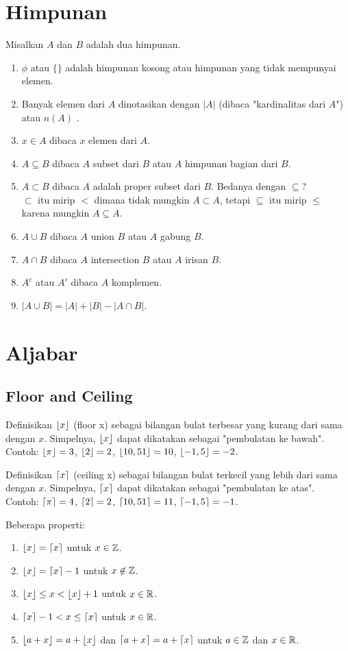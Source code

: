 \documentclass[11pt]{scrartcl}
\begin{document}
    	\section{Himpunan}    	
    	Misalkan $A$ dan $B$ adalah dua himpunan.
    	\begin{enumerate}
    	    \item $\phi$ atau $\{\}$ adalah himpunan kosong atau himpunan yang tidak mempunyai elemen.
    	    \item Banyak elemen dari $A$ dinotasikan dengan $|A|$ (dibaca "kardinalitas dari $A$") atau $n(A)$ .
    	    \item $x \in A$ dibaca $x$ elemen dari $A$.
    	    \item $A \subseteq B$ dibaca $A$ subset dari $B$ atau $A$ himpunan bagian dari $B$.
    	    \item $A \subset B$ dibaca $A$ adalah proper subset dari $B$. Bedanya dengan $\subseteq$?\\
    	    $\subset$ itu mirip $<$ dimana tidak mungkin $A \subset A$, tetapi $\subseteq$ itu mirip $\le$ karena mungkin $A \subseteq A$.
    	    \item $A \cup B$ dibaca $A$ union $B$ atau $A$ gabung $B$.
    	    \item $A \cap B$ dibaca $A$ intersection $B$ atau $A$ irisan $B$.
    	    \item $A^c$ atau $A'$ dibaca $A$ komplemen.
    	    \item $|A \cup B| = |A|+|B|-|A \cap B|$.
    	\end{enumerate}
    \section{Aljabar}
     \subsection{Floor and Ceiling}
    Definisikan $\left\lfloor x \right\rfloor$ (floor x) sebagai bilangan bulat terbesar yang kurang dari sama dengan $x$. Simpelnya, $\left\lfloor x \right\rfloor$ dapat dikatakan sebagai "pembulatan ke bawah". Contoh: $\left\lfloor \pi \right\rfloor=3$, $\left\lfloor 2 \right\rfloor=2$, $\left\lfloor 10,51 \right\rfloor=10$, $\left\lfloor -1,5 \right\rfloor=-2$.
    
    Definisikan $\left\lceil x \right\rceil$ (ceiling x) sebagai bilangan bulat terkecil yang lebih dari sama dengan $x$. Simpelnya, $\left\lceil x \right\rceil$ dapat dikatakan sebagai "pembulatan ke atas". Contoh: $\left\lceil \pi \right\rceil=4$, $\left\lceil 2 \right\rceil=2$, $\left\lceil 10,51 \right\rceil=11$, $\left\lceil -1,5 \right\rceil=-1$.
    
    Beberapa properti:
    \begin{enumerate}
        \item $\left\lfloor x \right\rfloor=\left\lceil x \right\rceil$ untuk $x \in \mathbb Z$.
        \item $\left\lfloor x \right\rfloor=\left\lceil x \right\rceil-1$ untuk $x \not \in \mathbb Z$.
        \item $\left\lfloor x \right\rfloor \le  x < \left\lfloor x \right\rfloor+1$ untuk $x \in \mathbb R$.
        \item $\left\lceil x \right\rceil-1 < x \le \left\lceil x \right\rceil$ untuk $x \in \mathbb R$.
        \item $\left\lfloor a+x \right\rfloor=a+\left\lfloor x \right\rfloor$ dan $\left\lceil a+x \right\rceil=a+\left\lceil x \right\rceil$ untuk $a\in \mathbb Z$ dan $x \in \mathbb R$.
    \end{enumerate}
    
\end{document}
